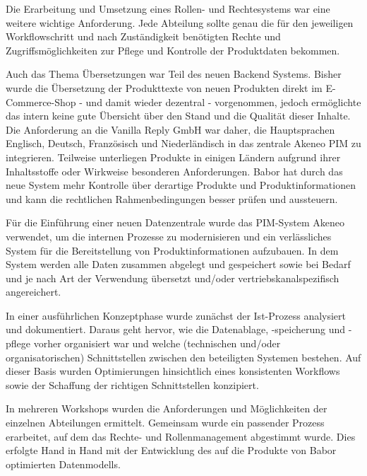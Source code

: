 Die Erarbeitung und Umsetzung eines Rollen- und Rechtesystems war eine weitere wichtige Anforderung. Jede Abteilung sollte genau die für den jeweiligen Workflowschritt und nach Zuständigkeit benötigten Rechte und Zugriffsmöglichkeiten zur Pflege und Kontrolle der Produktdaten bekommen.
\newline

Auch das Thema Übersetzungen war Teil des neuen Backend Systems. Bisher wurde die Übersetzung der Produkttexte von neuen Produkten direkt im E-Commerce-Shop - und damit wieder dezentral - vorgenommen, jedoch ermöglichte das intern keine gute Übersicht über den Stand und die Qualität dieser Inhalte. Die Anforderung an die Vanilla Reply GmbH war daher, die Hauptsprachen Englisch, Deutsch, Französisch und Niederländisch in das zentrale Akeneo PIM zu integrieren. Teilweise unterliegen Produkte in einigen Ländern aufgrund ihrer Inhaltsstoffe oder Wirkweise besonderen Anforderungen. Babor hat durch das neue System mehr Kontrolle über derartige Produkte und Produktinformationen und kann die rechtlichen Rahmenbedingungen besser prüfen und aussteuern.
\newline

Für die Einführung einer neuen Datenzentrale wurde das PIM-System Akeneo verwendet, um die internen Prozesse zu modernisieren und ein verlässliches System für die Bereitstellung von Produktinformationen aufzubauen. In dem System werden alle Daten zusammen abgelegt und gespeichert sowie bei Bedarf und je nach Art der Verwendung übersetzt und/oder vertriebskanalspezifisch angereichert.
\newline

In einer ausführlichen Konzeptphase wurde zunächst der Ist-Prozess analysiert und dokumentiert. Daraus geht hervor,  wie die Datenablage, -speicherung und -pflege vorher organisiert war und welche (technischen und/oder organisatorischen) Schnittstellen zwischen den beteiligten Systemen bestehen. Auf dieser Basis wurden Optimierungen hinsichtlich eines konsistenten Workflows sowie der Schaffung der richtigen Schnittstellen konzipiert.
\newline

In mehreren Workshops wurden die Anforderungen und Möglichkeiten der einzelnen Abteilungen ermittelt. Gemeinsam wurde ein passender Prozess erarbeitet, auf dem das Rechte- und Rollenmanagement abgestimmt wurde.
Dies erfolgte Hand in Hand mit der Entwicklung des auf die Produkte von Babor optimierten Datenmodells.
\newline

